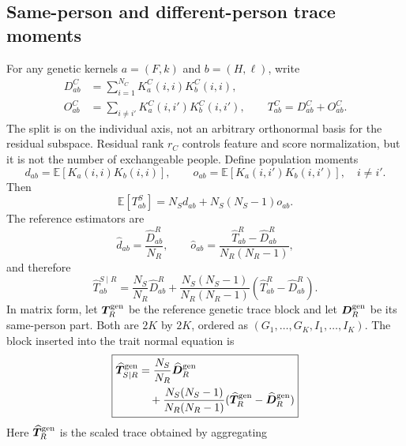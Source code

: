 \documentclass[11pt]{article}
\newcommand{\E}{\mathbb E}
\begin{document}
\subsection{Same-person and different-person trace moments}

For any genetic kernels $a=(F,k)$ and $b=(H,\ell)$, write
\begin{align}
 D^C_{ab}&=\sum_{i=1}^{N_C}K^C_a(i,i)K^C_b(i,i),\nonumber\\
 O^C_{ab}&=\sum_{i\ne i'}K^C_a(i,i')K^C_b(i,i'),\qquad
 T^C_{ab}=D^C_{ab}+O^C_{ab}.
 \label{eq:do}
\end{align}
The split is on the individual axis, not an arbitrary orthonormal basis for
the residual subspace.  Residual rank $r_C$ controls feature and score
normalization, but it is not the number of exchangeable people.  Define
population moments
\begin{equation}
 d_{ab}=\E[K_a(i,i)K_b(i,i)],\qquad
 o_{ab}=\E[K_a(i,i')K_b(i,i')],\quad i\ne i'.
\end{equation}
Then
\begin{equation}
 \E[T^S_{ab}]=N_Sd_{ab}+N_S(N_S-1)o_{ab}.
 \label{eq:populationtrace}
\end{equation}
The reference estimators are
\begin{equation}
 \widehat d_{ab}=\frac{\widehat D^R_{ab}}{N_R},\qquad
 \widehat o_{ab}=\frac{\widehat T^R_{ab}-\widehat D^R_{ab}}
 {N_R(N_R-1)},
\end{equation}
and therefore
\begin{equation}
 \boxed{\widehat T^{S\mid R}_{ab}
 =\frac{N_S}{N_R}\widehat D^R_{ab}
 +\frac{N_S(N_S-1)}{N_R(N_R-1)}
 (\widehat T^R_{ab}-\widehat D^R_{ab}).}
 \label{eq:transfer}
\end{equation}
In matrix form, let $\bm T^{\rm gen}_R$ be the reference genetic trace block
and let $\bm D^{\rm gen}_R$ be its same-person part.  Both are $2K$ by $2K$,
ordered as $(G_1,\ldots,G_K,I_1,\ldots,I_K)$.  The block inserted into the
trait normal equation is
\begin{equation}
 \boxed{\begin{aligned}
 \widehat{\bm T}^{\rm gen}_{S\mid R}
 &=\frac{N_S}{N_R}\widehat{\bm D}^{\rm gen}_R\\
 &\quad+\frac{N_S(N_S-1)}{N_R(N_R-1)}
  (\widehat{\bm T}^{\rm gen}_R-\widehat{\bm D}^{\rm gen}_R)
 \end{aligned}}
 \label{eq:matrixtransfer}
\end{equation}
Here $\widehat{\bm T}^{\rm gen}_R$ is the scaled trace obtained by aggregating
\end{document}
